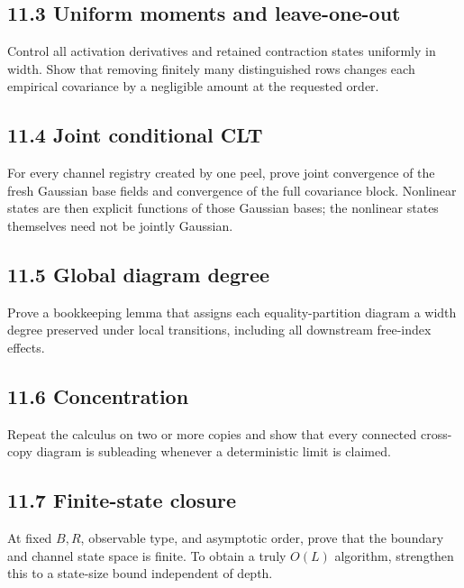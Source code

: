 \subsection*{11.3 Uniform moments and leave-one-out}


Control all activation derivatives and retained contraction states uniformly
in width. Show that removing finitely many distinguished rows changes each
empirical covariance by a negligible amount at the requested order.

\subsection*{11.4 Joint conditional CLT}


For every channel registry created by one peel, prove joint convergence of the
fresh Gaussian base fields and convergence of the full covariance block.
Nonlinear states are then explicit functions of those Gaussian bases; the
nonlinear states themselves need not be jointly Gaussian.

\subsection*{11.5 Global diagram degree}


Prove a bookkeeping lemma that assigns each equality-partition diagram a
width degree preserved under local transitions, including all downstream
free-index effects.

\subsection*{11.6 Concentration}


Repeat the calculus on two or more copies and show that every connected
cross-copy diagram is subleading whenever a deterministic limit is claimed.

\subsection*{11.7 Finite-state closure}


At fixed \(B,R\), observable type, and asymptotic order, prove that the
boundary and channel state space is finite. To obtain a truly \(O(L)\)
algorithm, strengthen this to a state-size bound independent of depth.

